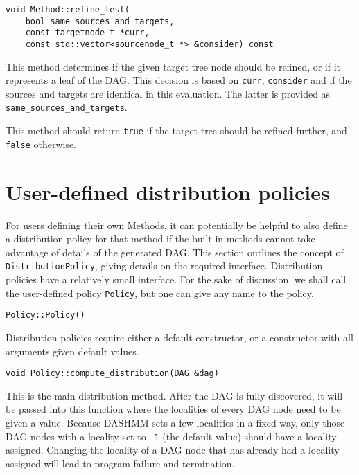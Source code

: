 \begin{lstlisting}
void Method::refine_test(
    bool same_sources_and_targets,
    const targetnode_t *curr,
    const std::vector<sourcenode_t *> &consider) const
\end{lstlisting}

\noindent
This method determines if the given target tree node should be refined, or if
it represents a leaf of the DAG. This decision is based on \texttt{curr},
\texttt{consider} and if the sources and targets are identical in this
evaluation. The latter is provided as \texttt{same\_sources\_and\_targets}.

This method should return \texttt{true} if the target tree should be refined
further, and \texttt{false} otherwise.



\section{User-defined distribution policies}

For users defining their own Methods, it can potentially be helpful to also
define a distribution policy for that method if the built-in methods cannot
take advantage of details of the generated DAG. This section outlines the
concept of \texttt{DistributionPolicy}, giving details on the required
interface. Distribution policies have a relatively small interface. For the
sake of discussion, we shall call the user-defined policy \texttt{Policy},
but one can give any name to the policy.

\begin{lstlisting}
Policy::Policy()
\end{lstlisting}

\noindent
Distribution policies require either a default constructor, or a constructor
with all arguments given default values.

\begin{lstlisting}
void Policy::compute_distribution(DAG &dag)
\end{lstlisting}

\noindent
This is the main distribution method. After the DAG is fully discovered, it will
be passed into this function where the localities of every DAG node need to be
given a value. Because DASHMM sets a few localities in a fixed way, only those
DAG nodes with a locality set to \texttt{-1} (the default value) should have
a locality assigned. Changing the locality of a DAG node that has already had
a locality assigned will lead to program failure and termination.

